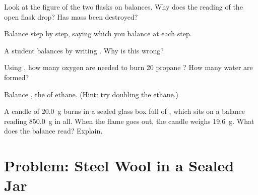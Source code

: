\begin{exercise}[$\star\star$]\label{exo:g8:balanced-equations:7}
Look at the figure of the two flasks on balances. Why does the reading
of the open flask drop? Has mass been destroyed?
\end{exercise}

\begin{exercise}[$\star\star$]\label{exo:g8:balanced-equations:8}
Balance  step by step, saying which  you %
balance at each step.
\end{exercise}

\begin{exercise}[$\star\star$]\label{exo:g8:balanced-equations:9}
A student balances  by writing . %
Why is this wrong?
\end{exercise}

\begin{exercise}[$\star\star$]\label{exo:g8:balanced-equations:10}
Using , how many oxygen  are
needed to burn 20 propane ? How many water  are
formed?
\end{exercise}

\begin{exercise}[$\star\star\star$]\label{exo:g8:balanced-equations:11}
Balance , the  of ethane. (Hint: try %
doubling the ethane.)
\end{exercise}

\begin{exercise}[$\star\star\star$]\label{exo:g8:balanced-equations:12}
A candle of \qty{20.0}{g} burns in a sealed glass box full of , which
sits on a balance reading \qty{850.0}{g} in all. When the flame goes out,
the candle weighs \qty{19.6}{g}. What does the balance read? Explain.
\end{exercise}

\section{Problem: Steel Wool in a Sealed Jar}

